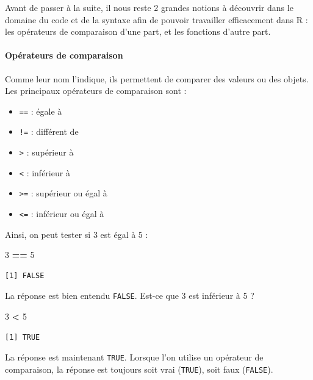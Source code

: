 \documentclass[a4paperpaper,]{article}
\newenvironment{Shaded}{\begin{snugshade}}{\end{snugshade}}
\newcommand{\DecValTok}[1]{\textcolor[rgb]{0.00,0.00,0.81}{#1}}
\newcommand{\StringTok}[1]{\textcolor[rgb]{0.31,0.60,0.02}{#1}}
\newcommand{\OperatorTok}[1]{\textcolor[rgb]{0.81,0.36,0.00}{\textbf{#1}}}
\providecommand{\tightlist}{%
  \setlength{\itemsep}{0pt}\setlength{\parskip}{0pt}}
\let\oldparagraph\paragraph
\renewcommand{\paragraph}[1]{\oldparagraph{#1}\mbox{}}
\theoremstyle{definition}
\theoremstyle{definition}
\theoremstyle{definition}
\theoremstyle{remark}
\begin{document}
Avant de passer à la suite, il nous reste 2 grandes notions à découvrir
dans le domaine du code et de la syntaxe afin de pouvoir travailler
efficacement dans R : les opérateurs de comparaison d'une part, et les
fonctions d'autre part.

\paragraph{Opérateurs de comparaison}\label{comparaison}

Comme leur nom l'indique, ils permettent de comparer des valeurs ou des
objets. Les principaux opérateurs de comparaison sont :

\begin{itemize}
\tightlist
\item
  \texttt{==} : égale à
\item
  \texttt{!=} : différent de
\item
  \texttt{\textgreater{}} : supérieur à
\item
  \texttt{\textless{}} : inférieur à
\item
  \texttt{\textgreater{}=} : supérieur ou égal à
\item
  \texttt{\textless{}=} : inférieur ou égal à
\end{itemize}

Ainsi, on peut tester si 3 est égal à 5 :

\begin{Shaded}
\begin{Highlighting}[]
\DecValTok{3} \OperatorTok{==}\StringTok{ }\DecValTok{5}
\end{Highlighting}
\end{Shaded}

\begin{verbatim}
[1] FALSE
\end{verbatim}

La réponse est bien entendu \texttt{FALSE}. Est-ce que 3 est inférieur à
5 ?

\begin{Shaded}
\begin{Highlighting}[]
\DecValTok{3} \OperatorTok{<}\StringTok{ }\DecValTok{5}
\end{Highlighting}
\end{Shaded}

\begin{verbatim}
[1] TRUE
\end{verbatim}

La réponse est maintenant \texttt{TRUE}. Lorsque l'on utilise un
opérateur de comparaison, la réponse est toujours soit vrai
(\texttt{TRUE}), soit faux (\texttt{FALSE}).
\end{document}
